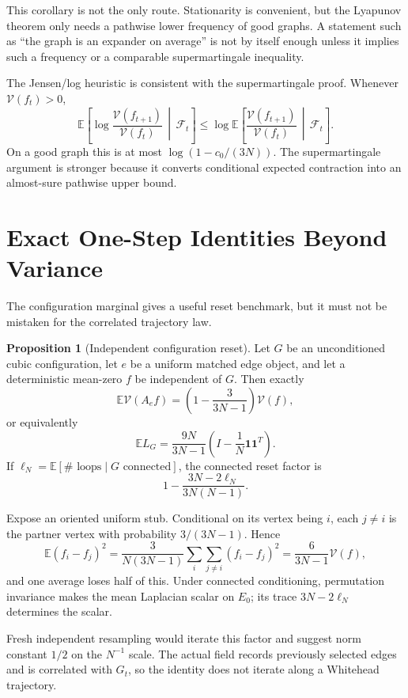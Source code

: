 \documentclass[11pt]{article}
\makeatletter
\newcommand{\E}{\mathbb E}
\newcommand{\V}{\mathcal V}
\newcommand{\one}{\mathbf 1}
\theoremstyle{definition}
\newtheorem{proposition}[theorem]{Proposition}
\renewenvironment{proof}[1][\proofname]{\par
  \pushQED{\qed}%
  \normalfont \topsep6\p@\@plus6\p@\relax
  \trivlist
  \item[\hskip\labelsep\bfseries #1\@addpunct{.}]\ignorespaces
}{%
  \popQED\endtrivlist\@endpefalse
}
\makeatother
\begin{document}
This corollary is not the only route.  Stationarity is convenient, but the
Lyapunov theorem only needs a pathwise lower frequency of good graphs.  A
statement such as ``the graph is an expander on average'' is not by itself
enough unless it implies such a frequency or a comparable supermartingale
inequality.

The Jensen/log heuristic is consistent with the supermartingale proof.  Whenever
$\V(f_t)>0$,
\[
    \E\left[
        \log\frac{\V(f_{t+1})}{\V(f_t)}
        \,\middle|\,\mathcal F_t
    \right]
    \le
    \log
    \E\left[
        \frac{\V(f_{t+1})}{\V(f_t)}
        \,\middle|\,\mathcal F_t
    \right].
\]
On a good graph this is at most $\log(1-c_0/(3N))$.  The supermartingale
argument is stronger because it converts conditional expected contraction into
an almost-sure pathwise upper bound.

\section{Exact One-Step Identities Beyond Variance}

The configuration marginal gives a useful reset benchmark, but it must not be
mistaken for the correlated trajectory law.

\begin{proposition}[Independent configuration reset]
Let $G$ be an unconditioned cubic configuration, let $e$ be a uniform matched
edge object, and let a deterministic mean-zero $f$ be independent of $G$.
Then exactly
\[
    \E\V(A_ef)=\left(1-\frac{3}{3N-1}\right)\V(f),
\]
or equivalently
\[
    \E L_G=\frac{9N}{3N-1}
       \left(I-\frac1N\one\one^T\right).
\]
If $\ell_N=\E[\#\text{ loops}\mid G\text{ connected}]$, the connected reset
factor is
\[
    1-\frac{3N-2\ell_N}{3N(N-1)}.
\]
\end{proposition}

\begin{proof}
Expose an oriented uniform stub.  Conditional on its vertex being $i$, each
$j\ne i$ is the partner vertex with probability $3/(3N-1)$.  Hence
\[
 \E(f_i-f_j)^2
 =\frac{3}{N(3N-1)}\sum_i\sum_{j\ne i}(f_i-f_j)^2
 =\frac{6}{3N-1}\V(f),
\]
and one average loses half of this.  Under connected conditioning,
permutation invariance makes the mean Laplacian scalar on $E_0$; its trace
$3N-2\ell_N$ determines the scalar.
\end{proof}

Fresh independent resampling would iterate this factor and suggest norm
constant $1/2$ on the $N^{-1}$ scale.  The actual field records previously
selected edges and is correlated with $G_t$, so the identity does not iterate
along a Whitehead trajectory.
\end{document}
